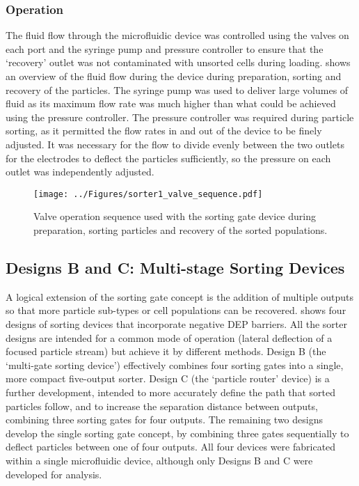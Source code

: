 \subsubsection{Operation}
The fluid flow through the microfluidic device was controlled using the valves on each port and the syringe pump and pressure controller to ensure that the `recovery' outlet was not contaminated with unsorted cells during loading.  shows an overview of the fluid flow during the device during preparation, sorting and recovery of the particles. The syringe pump was used to deliver large volumes of fluid as its maximum flow rate was much higher than what could be achieved using the pressure controller. The pressure controller was required during particle sorting, as it permitted the flow rates in and out of the device to be finely adjusted. It was necessary for the flow to divide evenly between the two outlets for the electrodes to deflect the particles sufficiently, so the pressure on each outlet was independently adjusted.

\begin{figure}[p]
	\centering
		\texttt{[image: ../Figures/sorter1\_valve\_sequence.pdf]}
	\caption[Valve operation sequence.]{Valve operation sequence used with the sorting gate device during preparation, sorting particles and recovery of the sorted populations.}
	\label{fig:sorter1_valve_sequence}
\end{figure}



\subsection{Designs B and C: Multi-stage Sorting Devices}

A logical extension of the sorting gate concept is the addition of multiple outputs so that more particle sub-types or cell populations can be recovered.  shows four designs of sorting devices that incorporate negative DEP barriers. All the sorter designs are intended for a common mode of operation (lateral deflection of a focused particle stream) but achieve it by different methods. Design B (the `multi-gate sorting device') effectively combines four sorting gates into a single, more compact five-output sorter. Design C (the `particle router' device) is a further development, intended to more accurately define the path that sorted particles follow, and to increase the separation distance between outputs, combining three sorting gates for four outputs. The remaining two designs develop the single sorting gate concept, by combining three gates sequentially to deflect particles between one of four outputs. All four devices were fabricated within a single microfluidic device, although only Designs B and C were developed for analysis.


